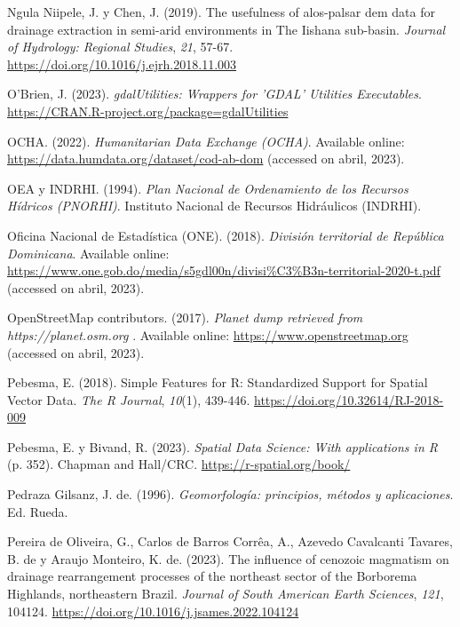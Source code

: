 \documentclass[spanish]{article}
\newlength{\cslhangindent}
\newlength{\cslentryspacingunit} %
\newenvironment{CSLReferences}[2] %
 {%
  \setlength{\parindent}{0pt}
  \ifodd #1
  \let\oldpar\par
  \def\par{\hangindent=\cslhangindent\oldpar}
  \fi
  \setlength{\parskip}{#2\cslentryspacingunit}
 }%
 {}
\begin{document}
\begin{CSLReferences}{1}{0}
\leavevmode{}%
Ngula Niipele, J. y Chen, J. (2019). {The usefulness of alos-palsar dem
data for drainage extraction in semi-arid environments in The Iishana
sub-basin}. \emph{Journal of Hydrology: Regional Studies}, \emph{21},
57-67. \url{https://doi.org/10.1016/j.ejrh.2018.11.003}

\leavevmode{}%
O'Brien, J. (2023). \emph{gdalUtilities: Wrappers for 'GDAL' Utilities
Executables}. \url{https://CRAN.R-project.org/package=gdalUtilities}

\leavevmode{}%
OCHA. (2022). \emph{{Humanitarian Data Exchange (OCHA)}}. Available
online: \url{https://data.humdata.org/dataset/cod-ab-dom} (accessed on
abril, 2023).

\leavevmode{}%
OEA y INDRHI. (1994). \emph{{Plan Nacional de Ordenamiento de los
Recursos Hídricos (PNORHI)}}. {Instituto Nacional de Recursos
Hidráulicos (INDRHI)}.

\leavevmode{}%
Oficina Nacional de Estadística (ONE). (2018). \emph{{División
territorial de República Dominicana}}. Available online:
\url{https://www.one.gob.do/media/s5gdl00n/divisi\%C3\%B3n-territorial-2020-t.pdf}
(accessed on abril, 2023).

\leavevmode{}%
OpenStreetMap contributors. (2017). \emph{{Planet dump retrieved from
https://planet.osm.org }}. Available online:
\url{https://www.openstreetmap.org} (accessed on abril, 2023).

\leavevmode{}%
Pebesma, E. (2018). {Simple Features for R: Standardized Support for
Spatial Vector Data}. \emph{{The R Journal}}, \emph{10}(1), 439-446.
\url{https://doi.org/10.32614/RJ-2018-009}

\leavevmode{}%
Pebesma, E. y Bivand, R. (2023). \emph{{Spatial Data Science: With
applications in R}} (p. 352). {Chapman and Hall/CRC}.
\url{https://r-spatial.org/book/}

\leavevmode{}%
Pedraza Gilsanz, J. de. (1996). \emph{Geomorfología: principios, métodos
y aplicaciones}. Ed. Rueda.

\leavevmode{}%
Pereira de Oliveira, G., Carlos de Barros Corrêa, A., Azevedo Cavalcanti
Tavares, B. de y Araujo Monteiro, K. de. (2023). The influence of
cenozoic magmatism on drainage rearrangement processes of the northeast
sector of the {Borborema} {Highlands}, northeastern {Brazil}.
\emph{Journal of South American Earth Sciences}, \emph{121}, 104124.
\url{https://doi.org/10.1016/j.jsames.2022.104124}


\end{CSLReferences}
\end{document}
